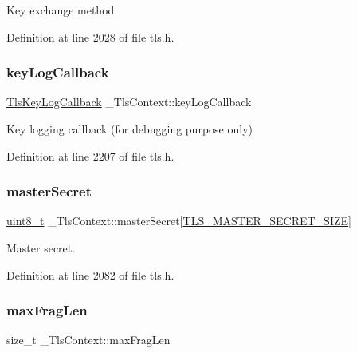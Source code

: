 Key exchange method. 



Definition at line 2028 of file tls.\+h.

\mbox{\label{struct__TlsContext_a9785cb9de496cd322a403f5485313a40}} 
\subsubsection{\texorpdfstring{key\+Log\+Callback}{keyLogCallback}}
{\footnotesize\ttfamily \hyperlink{tls_8h_a562fd539fc11782835f2692e3dcaf5b1}{Tls\+Key\+Log\+Callback} \+\_\+\+Tls\+Context\+::key\+Log\+Callback}



Key logging callback (for debugging purpose only) 



Definition at line 2207 of file tls.\+h.

\mbox{\label{struct__TlsContext_a2eed8d508d7c690527be1db26cdae8f6}} 
\subsubsection{\texorpdfstring{master\+Secret}{masterSecret}}
{\footnotesize\ttfamily \hyperlink{stdint_8h_aba7bc1797add20fe3efdf37ced1182c5}{uint8\+\_\+t} \+\_\+\+Tls\+Context\+::master\+Secret\mbox{[}\hyperlink{tls_8h_ae3ac5e6ccd1e8295f15951175e3b7e2b}{T\+L\+S\+\_\+\+M\+A\+S\+T\+E\+R\+\_\+\+S\+E\+C\+R\+E\+T\+\_\+\+S\+I\+ZE}\mbox{]}}



Master secret. 



Definition at line 2082 of file tls.\+h.

\mbox{\label{struct__TlsContext_a723067597b337a48f497e912fc0dd3d4}} 
\subsubsection{\texorpdfstring{max\+Frag\+Len}{maxFragLen}}
{\footnotesize\ttfamily size\+\_\+t \+\_\+\+Tls\+Context\+::max\+Frag\+Len}



